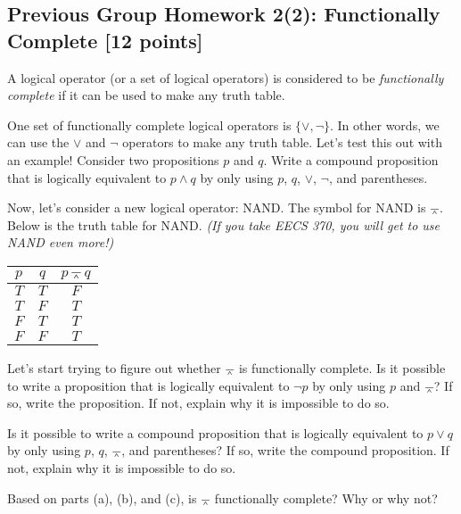 \documentclass[12pt]{exam}
\begin{document}
\subsection*{Previous Group Homework 2(2): Functionally Complete [12 points]}
A logical operator (or a set of logical operators) is considered to be \textit{functionally complete} if it can be used to make any truth table.
\begin{qparts}
    \item One set of functionally complete logical operators is $\{ \lor, \neg \}$. In other words, we can use the $\lor$ and $\neg$ operators to make any truth table. Let's test this out with an example! Consider two propositions $p$ and $q$. Write a compound proposition that is logically equivalent to $p \land q$ by only using $p$, $q$, $\lor$, $\neg$, and parentheses.
    \item Now, let's consider a new logical operator: NAND. The symbol for NAND is $\barwedge$. Below is the truth table for NAND. \emph{(If you take EECS 370, you will get to use NAND even more!)}
    \begin{center}
            \begin{tabular}{c c | c}
            $p$ & $q$ & $p \barwedge q$ \\
            \hline
            $T$ & $T$ & $F$\\
            $T$ & $F$ & $T$\\
            $F$ & $T$ & $T$\\
            $F$ & $F$ & $T$\\
            \end{tabular}
        \end{center}
        Let's start trying to figure out whether $\barwedge$ is functionally complete. Is it possible to write a proposition that is logically equivalent to $\neg p$ by only using $p$ and $\barwedge$? If so, write the proposition. If not, explain why it is impossible to do so.
    \item Is it possible to write a compound proposition that is logically equivalent to $p \lor q$ by only using $p$, $q$, $\barwedge$, and parentheses? If so, write the compound proposition. If not, explain why it is impossible to do so.
    \item Based on parts (a), (b), and (c), is $\barwedge$ functionally complete? Why or why not?
\end{qparts}
\end{document}
